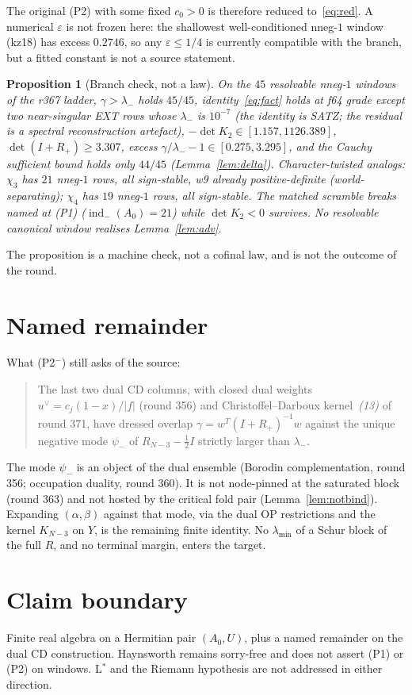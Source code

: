 \documentclass[11pt]{article}
\newtheorem{prop}{Proposition}
\theoremstyle{remark}
\newcommand{\half}{\tfrac12}
\newcommand{\lam}{\lambda_{-}}
\newcommand{\psim}{\psi_{-}}
\newcommand{\Rp}{R_{+}}
\begin{document}
The original (P2) with some fixed $c_{0}>0$ is therefore reduced
to~\eqref{eq:red}.  A numerical $\varepsilon$ is not frozen here:
the shallowest well-conditioned nneg-$1$ window (kz18) has excess
$0.2746$, so any $\varepsilon\le 1/4$ is currently compatible with
the branch, but a fitted constant is not a source statement.

\begin{prop}[Branch check, not a law]\label{prop:branch}
On the $45$ resolvable nneg-$1$ windows of the r367 ladder,
$\gamma>\lam$ holds $45/45$, identity~\eqref{eq:fact} holds at
f64 grade except two near-singular EXT rows whose $\lam$ is
$10^{-7}$ (the identity is SATZ; the residual is a spectral
reconstruction artefact), $-\det K_{2}\in[1.157,1126.389]$,
$\det(I+\Rp)\ge 3.307$, excess $\gamma/\lam-1\in[0.275,3.295]$,
and the Cauchy sufficient bound holds only $44/45$
(Lemma~\ref{lem:delta}).  Character-twisted analogs: $\chi_{3}$
has $21$ nneg-$1$ rows, all sign-stable, w9 already
positive-definite (world-separating); $\chi_{4}$ has $19$ nneg-$1$
rows, all sign-stable.  The matched scramble breaks named at
(P1) ($\operatorname{ind}_{-}(A_{0})=21$) while $\det K_{2}<0$
survives.  No resolvable canonical window realises
Lemma~\ref{lem:adv}.
\end{prop}

The proposition is a machine check, not a cofinal law, and is not
the outcome of the round.

\section{Named remainder}\label{sec:rem}

What (P2$^{-}$) still asks of the source:
\begin{quote}
The last two dual CD columns, with closed dual weights
$u^{\vee}=c_{j}(1-x)/|f|$ (round 356) and Christoffel--Darboux
kernel~\emph{(13)} of round 371, have dressed overlap
$\gamma=w^{T}(I+\Rp)^{-1}w$ against the unique negative mode
$\psim$ of $R_{N-3}-\half I$ strictly larger than $\lam$.
\end{quote}
The mode $\psim$ is an object of the dual ensemble (Borodin
complementation, round 356; occupation duality, round 360).  It
is not node-pinned at the saturated block (round 363) and not
hosted by the critical fold pair (Lemma~\ref{lem:notbind}).
Expanding $(\alpha,\beta)$ against that mode, via the dual OP
restrictions and the kernel $K_{N-3}$ on $Y$, is the remaining
finite identity.  No $\lambda_{\min}$ of a Schur block of the
full $R$, and no terminal margin, enters the target.

\section{Claim boundary}

Finite real algebra on a Hermitian pair $(A_{0},U)$, plus a
named remainder on the dual CD construction.  Haynsworth remains
sorry-free and does not assert (P1) or (P2) on windows.  L$^{*}$
and the Riemann hypothesis are not addressed in either direction.
\end{document}
